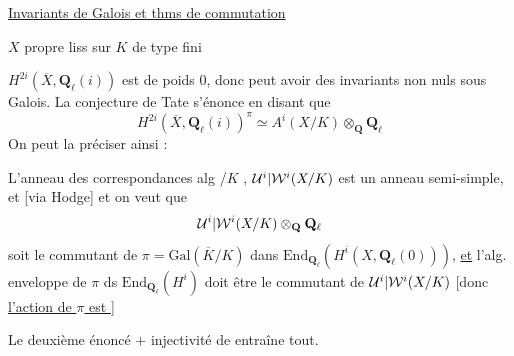 \uline{Invariants de Galois et thms de commutation}

$X$ propre liss sur $K$ de type fini

$H^{2i}(\overline{X},\mathbf{Q}_\ell(i))$ est de poids $0$, donc peut avoir des invariants non nuls sous Galois.
La conjecture de Tate s'énonce en disant que
\[
H^{2i}(\overline{X},\mathbf{Q}_\ell(i))^\pi\simeq A^i(X/K)\otimes_{\mathbf{Q}}\mathbf{Q}_\ell
\]
On peut la préciser ainsi :

L'anneau des correspondances alg /$K$  ,  $\mathcal{U}^i|\mathcal{W}^i(X/K)$ est un anneau semi-simple, et [via Hodge] et on veut que
\[
\mathcal{U}^i|\mathcal{W}^i(X/K)\otimes_{\mathbf{Q}}\mathbf{Q}_\ell
\]
soit le commutant de $\pi=\mathrm{Gal}(\overline{K}/K)$ dans $\mathrm{End}_{\mathbf{Q}_\ell}(H^i(X,\mathbf{Q}_\ell(0)))$, \uline{et} l'alg. enveloppe de $\pi$ ds $\mathrm{End}_{\mathbf{Q}_\ell}(H^i)$ doit être le commutant de $\mathcal{U}^i|\mathcal{W}^i(X/K)$ [donc \uline{l'action de $\pi$ est }]

Le deuxième énoncé $+$ injectivité de
entraîne tout.
